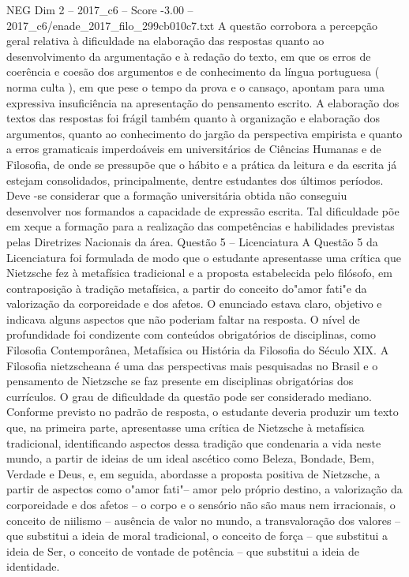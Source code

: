 \begin{textsample}{NEG Dim 2 – 2017\_c6 – Score -3.00 – 2017\_c6/enade\_2017\_filo\_299cb010c7.txt}
A questão corrobora a percepção geral relativa à dificuldade na elaboração das respostas quanto ao desenvolvimento da argumentação e à redação do texto, em que os erros de coerência e coesão dos argumentos e de conhecimento da língua portuguesa ( norma culta ), em que pese o tempo da prova e o cansaço, apontam para uma expressiva insuficiência na apresentação do pensamento escrito.
A elaboração dos textos das respostas foi frágil também quanto à organização e elaboração dos argumentos, quanto ao conhecimento do jargão da perspectiva empirista e quanto a erros gramaticais imperdoáveis em universitários de Ciências Humanas e de Filosofia, de onde se pressupõe que o hábito e a prática da leitura e da escrita já estejam consolidados, principalmente, dentre estudantes dos últimos períodos.
Deve -se considerar que a formação universitária obtida não conseguiu desenvolver nos formandos a capacidade de expressão escrita.
Tal dificuldade põe em xeque a formação para a realização das competências e habilidades previstas pelas Diretrizes Nacionais da área.
Questão 5 – Licenciatura A Questão 5 da Licenciatura foi formulada de modo que o estudante apresentasse uma crítica que Nietzsche fez à metafísica tradicional e a proposta estabelecida pelo filósofo, em contraposição à tradição metafísica, a partir do conceito do"amor fati"e da valorização da corporeidade e dos afetos.
O enunciado estava claro, objetivo e indicava alguns aspectos que não poderiam faltar na resposta.
O nível de profundidade foi condizente com conteúdos obrigatórios de disciplinas, como Filosofia Contemporânea, Metafísica ou História da Filosofia do Século XIX.
A Filosofia nietzscheana é uma das perspectivas mais pesquisadas no Brasil e o pensamento de Nietzsche se faz presente em disciplinas obrigatórias dos currículos.
O grau de dificuldade da questão pode ser considerado mediano.
Conforme previsto no padrão de resposta, o estudante deveria produzir um texto que, na primeira parte, apresentasse uma crítica de Nietzsche à metafísica tradicional, identificando aspectos dessa tradição que condenaria a vida neste mundo, a partir de ideias de um ideal ascético como Beleza, Bondade, Bem, Verdade e Deus, e, em seguida, abordasse a proposta positiva de Nietzsche, a partir de aspectos como o"amor fati"– amor pelo próprio destino, a valorização da corporeidade e dos afetos – o corpo e o sensório não são maus nem irracionais, o conceito de niilismo – ausência de valor no mundo, a transvaloração dos valores – que substitui a ideia de moral tradicional, o conceito de força – que substitui a ideia de Ser, o conceito de vontade de potência – que substitui a ideia de identidade.

\end{textsample}
